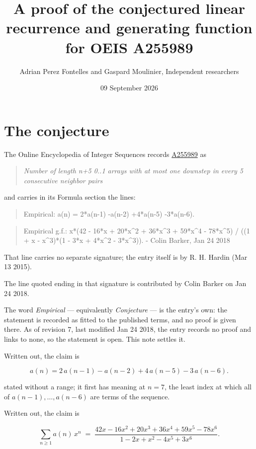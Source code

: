 \documentclass[11pt]{article}
\title{A proof of the conjectured linear recurrence and generating function for OEIS A255989}
\author{Adrian Perez Fontelles and Gaspard Moulinier, Independent researchers}
\date{09 September 2026}
\theoremstyle{definition}
\begin{document}
\maketitle
\section{The conjecture}

The Online Encyclopedia of Integer Sequences records \href{https://oeis.org/A255989}{A255989} as

\begin{quote}\itshape Number of length n+5 0..1 arrays with at most one downstep in every 5 consecutive neighbor pairs\end{quote}

and carries in its Formula section the lines:

\begin{quote}\ttfamily Empirical: a(n) = 2*a(n-1) -a(n-2) +4*a(n-5) -3*a(n-6).\end{quote}

\begin{quote}\ttfamily Empirical g.f.: x*(42 - 16*x + 20*x\textasciicircum{}2 + 36*x\textasciicircum{}3 + 59*x\textasciicircum{}4 - 78*x\textasciicircum{}5) / ((1 + x - x\textasciicircum{}3)*(1 - 3*x + 4*x\textasciicircum{}2 - 3*x\textasciicircum{}3)). - Colin Barker, Jan 24 2018\end{quote}

That line carries no separate signature; the entry itself is by R. H. Hardin (Mar 13 2015).

The line quoted ending in that signature is contributed by Colin Barker on Jan 24 2018.

The word {\itshape Empirical} --- equivalently {\itshape Conjecture} --- is the entry's own: the statement is recorded as fitted to the published terms, and no proof is given there. As of revision 7, last modified Jan 24 2018, the entry records no proof and links to none, so the statement is open. This note settles it.

Written out, the claim is

\[a(n) = 2\,a(n-1) - a(n-2) + 4\,a(n-5) - 3\,a(n-6).\]

stated without a range; it first has meaning at $n = 7$, the least index at which all of $a(n-1),\dots,a(n-6)$ are terms of the sequence.

Written out, the claim is

\[\sum_{n \ge 1} a(n)\,x^n \;=\; \frac{42x - 16x^{2} + 20x^{3} + 36x^{4} + 59x^{5} - 78x^{6}}{1 - 2x + x^{2} - 4x^{5} + 3x^{6}}.\]
\end{document}
